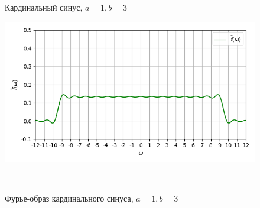 \documentclass[a4paper]{article}
\begin{document}
\begin{figure}[H]
\begin{minipage}{0.5\textwidth}
        \caption{Кардинальный синус, $a = 1, b = 3$}
    \end{minipage}\hfill
    \begin{minipage}{0.5\textwidth}
        \centering \includegraphics[width=\textwidth]{sinc/real_fourier_1_3.png}
        \caption{Фурье-образ кардинального синуса, $a = 1, b = 3$}
    \end{minipage}\\[1em]
\end{figure}\noindent\
\end{document}
